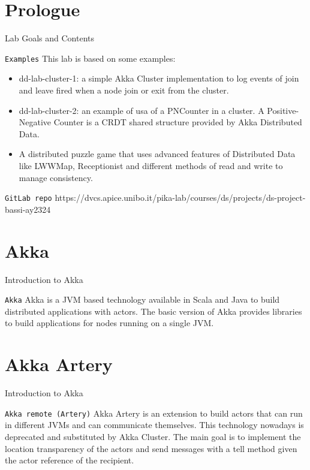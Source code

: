 \documentclass[presentation,apice]{beamer}\mode<presentation>{\usetheme{AMSBolognaFC}}
\begin{document}
\section{Prologue}
\begin{frame}[c,fragile]{Lab Goals and Contents}
\begin{block}{\texttt{Examples}}
This lab is based on some examples:
\begin{itemize}
    \item dd-lab-cluster-1: a simple Akka Cluster implementation to log events of join and leave fired when a node join or exit from the cluster.
    \item dd-lab-cluster-2: an example of usa of a PNCounter in a cluster. A Positive-Negative Counter is a CRDT shared structure provided by Akka Distributed Data.
    \item A distributed puzzle game that uses advanced features of Distributed Data like LWWMap, Receptionist and different methods of read and write to manage consistency.
\end{itemize}
\end{block}
\begin{block}{\texttt{GitLab repo}}
https://dvcs.apice.unibo.it/pika-lab/courses/ds/projects/ds-project-bassi-ay2324
\end{block}

\end{frame}
\section{Akka}
\begin{frame}[c,fragile]{Introduction to Akka}
\begin{block}{\texttt{Akka}}
Akka is a JVM based technology available in Scala and Java to build distributed applications with actors.
The basic version of Akka provides libraries to build applications for nodes running on a single JVM.
\end{block}
\end{frame}

\section{Akka Artery}
\begin{frame}[c,fragile]{Introduction to Akka}
\begin{block}{\texttt{Akka remote (Artery)}}
Akka Artery is an extension to build actors that can run in different JVMs and can communicate themselves. 
This technology nowadays is deprecated and substituted by Akka Cluster.
The main goal is to implement the location transparency of the actors and send messages with a tell method given the actor reference of the recipient.
\end{block}
\end{frame}
\end{document}
